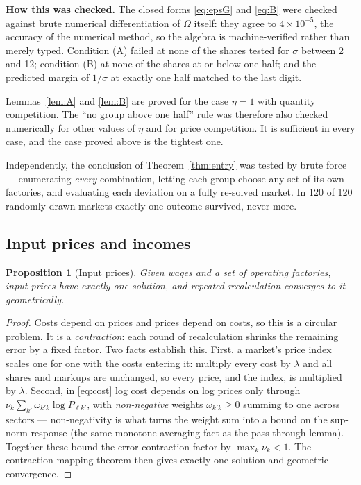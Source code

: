 \documentclass[11pt]{article}
\newcommand{\checked}[1]{\smallskip\noindent\textbf{How this was checked.} #1\smallskip}
\theoremstyle{plain}
\newtheorem{proposition}{Proposition}
\theoremstyle{remark}
\theoremstyle{definition}
\begin{document}
\checked{The closed forms \eqref{eq:epsG} and \eqref{eq:B} were checked against brute
numerical differentiation of $\Omega$ itself: they agree to $4\times10^{-5}$, the
accuracy of the numerical method, so the algebra is machine-verified rather than merely
typed. Condition (A) failed at none of the shares tested for $\sigma$ between 2 and 12;
condition (B) at none of the shares at or below one half; and the predicted margin of
$1/\sigma$ at exactly one half matched to the last digit.

Lemmas~\ref{lem:A} and \ref{lem:B} are proved for the case $\eta=1$ with quantity
competition. The ``no group above one half'' rule was therefore also checked
numerically for other values of $\eta$ and for price competition. It is sufficient in
every case, and the case proved above is the tightest one.

Independently, the conclusion of Theorem~\ref{thm:entry} was tested by brute force ---
enumerating \emph{every} combination, letting each group choose any set of its own
factories, and evaluating each deviation on a fully re-solved market. In 120 of 120
randomly drawn markets exactly one outcome survived, never more.}

\subsection{Input prices and incomes}

\begin{proposition}[Input prices]\label{prop:prices}
Given wages and a set of operating factories, input prices have exactly one solution,
and repeated recalculation converges to it geometrically.
\end{proposition}

\begin{proof}
Costs depend on prices and prices depend on costs, so this is a circular problem. It is
a \emph{contraction}: each round of recalculation shrinks the remaining error by a
fixed factor. Two facts establish this. First, a market's price index scales one for
one with the costs entering it: multiply every cost by $\lambda$ and all shares and
markups are unchanged, so every price, and the index, is multiplied by $\lambda$.
Second, in \eqref{eq:cost} log cost depends on log prices only through
$\nu_k\sum_{k'}\omega_{k'k}\log P_{\ell k'}$, with \emph{non-negative} weights
$\omega_{k'k}\ge0$ summing to one across sectors --- non-negativity is what turns the
weight sum into a bound on the sup-norm response (the same monotone-averaging fact as
the pass-through lemma). Together these bound the error contraction factor by
$\max_k\nu_k<1$. The contraction-mapping theorem then gives exactly one solution and
geometric convergence.
\end{proof}
\end{document}
